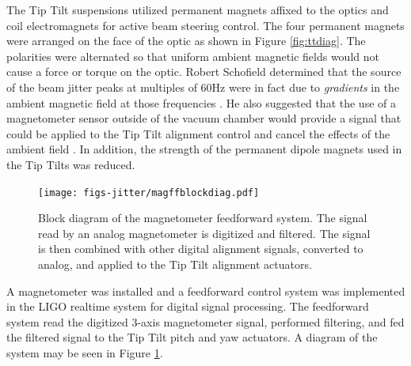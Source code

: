 The Tip Tilt suspensions utilized permanent magnets affixed to the optics and coil electromagnets for active beam steering control. %
The four permanent magnets were arranged on the face of the optic as shown in Figure \ref{fig:ttdiag}. %
The polarities were alternated so that uniform ambient magnetic fields would not cause a force or torque on the optic. %
Robert Schofield determined that the source of the beam jitter peaks at multiples of 60Hz were in fact due to \emph{gradients} in the ambient magnetic field at those frequencies \cite{60Hzgrad}. %
He also suggested that the use of a magnetometer sensor outside of the vacuum chamber would provide a signal that could be applied to the Tip Tilt alignment control and cancel the effects of the ambient field \cite{60hzff}. %
In addition, the strength of the permanent dipole magnets used in the Tip Tilts was reduced.

\begin{figure}
  \begin{center}
  \leavevmode
  \texttt{[image: figs-jitter/magffblockdiag.pdf]}
  \end{center}
  \caption[Block diagram of the magnetometer feedforward system.]{Block diagram of the magnetometer feedforward system. The signal read by an analog magnetometer is digitized and filtered. The signal is then combined with other digital alignment signals, converted to analog, and applied to the Tip Tilt alignment actuators.}
  \label{fig:magffblockdiag}
\end{figure}

A magnetometer was installed and a feedforward control system was implemented in the LIGO realtime system for digital signal processing. %
The feedforward system read the digitized 3-axis magnetometer signal, performed filtering, and fed the filtered signal to the Tip Tilt pitch and yaw actuators. %
A diagram of the system may be seen in Figure \ref{fig:magffblockdiag}. %


